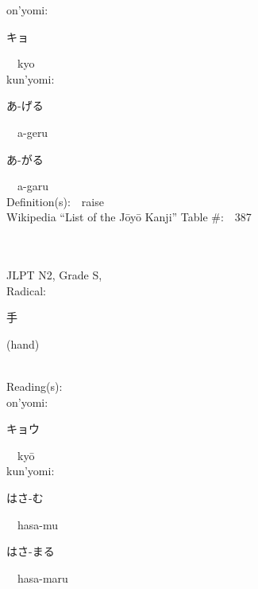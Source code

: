 \begin{multicols}{2}
{\hspace*{1em}}on'yomi:\ \ \\
{\hspace*{2em}}{\begin{CJK}{UTF8}{min} キョ \end{CJK}}\ \ kyo\ \ \\
{\hspace*{1em}}kun'yomi:\ \ \\
{\hspace*{2em}}{\begin{CJK}{UTF8}{min} あ-げる \end{CJK}}\ \ a-geru\ \ \\
{\hspace*{2em}}{\begin{CJK}{UTF8}{min} あ-がる \end{CJK}}\ \ a-garu\ \ \\
Definition(s):\ \ raise \\
Wikipedia ``List of the J\=oy\=o Kanji'' Table \#:\ \ 387 \\
\ \ \\
{\fontsize{34pt}{40pt}  }\ \ \\  %
{JLPT N2, Grade S, \\Radical:\ \ {\begin{CJK}{UTF8}{min} 手 \end{CJK}} (hand) } \\
Reading(s):\ \ \\
{\hspace*{1em}}on'yomi:\ \ \\
{\hspace*{2em}}{\begin{CJK}{UTF8}{min} キョウ \end{CJK}}\ \ ky\=o\ \ \\
{\hspace*{1em}}kun'yomi:\ \ \\
{\hspace*{2em}}{\begin{CJK}{UTF8}{min} はさ-む \end{CJK}}\ \ hasa-mu\ \ \\
{\hspace*{2em}}{\begin{CJK}{UTF8}{min} はさ-まる \end{CJK}}\ \ hasa-maru\ \ \\

\end{multicols}

